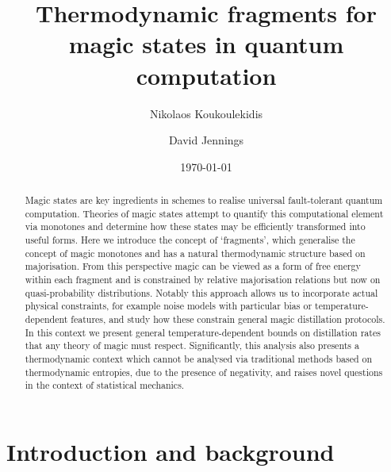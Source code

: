 \documentclass[pra,
aps,
twocolumn,
superscriptaddress,
groupedaddress,
nofootinbib,
reprint
]{revtex4-1}
\begin{document}

\begin{abstract}
\ddd{[To be sharpened]} Magic states are key ingredients in schemes to realise universal fault-tolerant quantum computation.
Theories of magic states attempt to quantify this computational element via monotones and determine how these states may be efficiently transformed into useful forms. Here we introduce the concept of `fragments', which generalise the concept of magic monotones and has a natural thermodynamic structure based on majorisation. From this perspective magic can be viewed as a form of free energy within each fragment and is constrained by relative majorisation relations but now on quasi-probability distributions. Notably this approach allows us to incorporate actual physical constraints, for example noise models with particular bias or temperature-dependent features, and study how these constrain general magic distillation protocols. In this context we present general temperature-dependent bounds on distillation rates that any theory of magic must respect. Significantly, this analysis also presents a thermodynamic context which cannot be analysed via traditional methods based on thermodynamic entropies, due to the presence of negativity, and raises novel questions in the context of statistical mechanics.
\end{abstract}


\title{Thermodynamic fragments for magic states in quantum computation}

\author{Nikolaos Koukoulekidis}
\author{David Jennings}

\date{\today}
\maketitle


\section{Introduction and background}
\label{sec:intro_prev}
\end{document}
